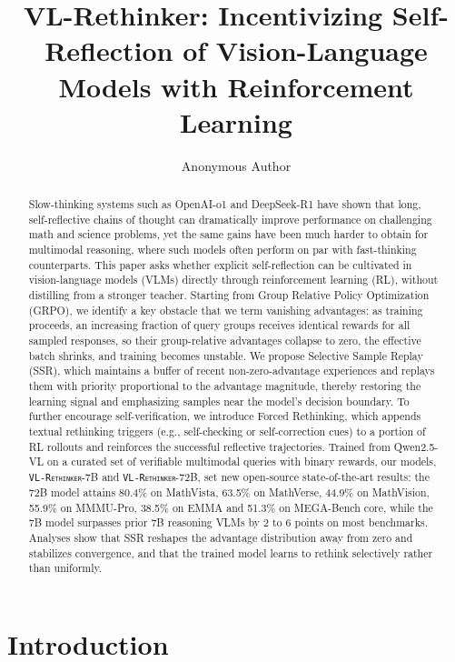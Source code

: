 \documentclass{article}
\title{VL-Rethinker: Incentivizing Self-Reflection of Vision-Language Models with Reinforcement Learning}
\author{Anonymous Author}
\newcommand{\model}{\texttt{\textsc{VL-Rethinker}}\xspace}
\begin{document}
\maketitle

\begin{abstract}
Slow-thinking systems such as OpenAI-o1 and DeepSeek-R1 have shown that long, self-reflective chains of thought can dramatically improve performance on challenging math and science problems, yet the same gains have been much harder to obtain for multimodal reasoning, where such models often perform on par with fast-thinking counterparts. This paper asks whether explicit self-reflection can be cultivated in vision-language models (VLMs) directly through reinforcement learning (RL), without distilling from a stronger teacher. Starting from Group Relative Policy Optimization (GRPO), we identify a key obstacle that we term vanishing advantages: as training proceeds, an increasing fraction of query groups receives identical rewards for all sampled responses, so their group-relative advantages collapse to zero, the effective batch shrinks, and training becomes unstable. We propose Selective Sample Replay (SSR), which maintains a buffer of recent non-zero-advantage experiences and replays them with priority proportional to the advantage magnitude, thereby restoring the learning signal and emphasizing samples near the model's decision boundary. To further encourage self-verification, we introduce Forced Rethinking, which appends textual rethinking triggers (e.g., self-checking or self-correction cues) to a portion of RL rollouts and reinforces the successful reflective trajectories. Trained from Qwen2.5-VL on a curated set of verifiable multimodal queries with binary rewards, our models, \model-7B and \model-72B, set new open-source state-of-the-art results: the 72B model attains 80.4\% on MathVista, 63.5\% on MathVerse, 44.9\% on MathVision, 55.9\% on MMMU-Pro, 38.5\% on EMMA and 51.3\% on MEGA-Bench core, while the 7B model surpasses prior 7B reasoning VLMs by 2 to 6 points on most benchmarks. Analyses show that SSR reshapes the advantage distribution away from zero and stabilizes convergence, and that the trained model learns to rethink selectively rather than uniformly.
\end{abstract}

\section{Introduction}
\label{sec:intro}
\end{document}
